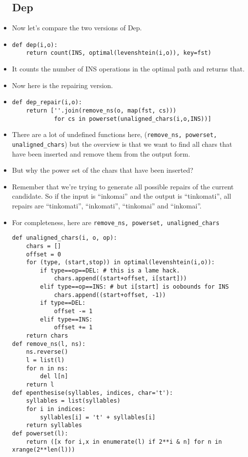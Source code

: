 \documentclass{article}[11pt]
\begin{document}
\begin{itemize}
\subsection{Dep}
\item Now let's compare the two versions of Dep.
\item
\begin{verbatim}
def dep(i,o):
    return count(INS, optimal(levenshtein(i,o)), key=fst)
\end{verbatim}
\item It counts the number of INS operations in the optimal path and
  returns that.
\item Now here is the repairing version.
\item
\begin{verbatim}
def dep_repair(i,o):
    return [''.join(remove_ns(o, map(fst, cs)))
            for cs in powerset(unaligned_chars(i,o,INS))]
\end{verbatim}
\item There are a lot of undefined functions here,
  (\verb+remove_ns, powerset, unaligned_chars+) but the overview is that
  we want to find all chars that have been inserted and remove them from the
  output form.
\item But why the power set of the chars that have been inserted?
\item Remember that we're trying to generate all possible repairs of the current
  candidate. So if the input is ``inkomai'' and the output is ``tinkomati'', all repairs
  are ``tinkomati'', ``inkomati'', ``tinkomai'' and ``inkomai''.
\item For completeness, here are
  \verb+remove_ns, powerset, unaligned_chars+
\begin{verbatim}
def unaligned_chars(i, o, op):
    chars = []
    offset = 0
    for (type, (start,stop)) in optimal(levenshtein(i,o)):
        if type==op==DEL: # this is a lame hack.
            chars.append((start+offset, i[start]))
        elif type==op==INS: # but i[start] is oobounds for INS
            chars.append((start+offset, -1))
        if type==DEL:
            offset -= 1
        elif type==INS:
            offset += 1
    return chars
def remove_ns(l, ns):
    ns.reverse()
    l = list(l)
    for n in ns:
        del l[n]
    return l
def epenthesise(syllables, indices, char='t'):
    syllables = list(syllables)
    for i in indices:
        syllables[i] = 't' + syllables[i]
    return syllables
def powerset(l):
    return ([x for i,x in enumerate(l) if 2**i & n] for n in xrange(2**len(l)))
\end{verbatim}

\end{itemize}
\end{document}
